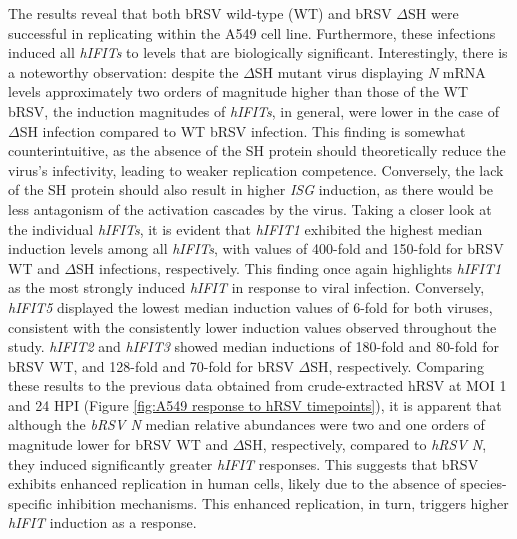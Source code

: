 The results reveal that both bRSV wild-type (WT) and bRSV \(\Delta\)SH were successful in replicating within the A549 cell line. Furthermore, these infections induced all \textit{hIFITs} to levels that are biologically significant. Interestingly, there is a noteworthy observation: despite the \(\Delta\)SH mutant virus displaying \textit{N} mRNA levels approximately two orders of magnitude higher than those of the WT bRSV, the induction magnitudes of \textit{hIFITs}, in general, were lower in the case of \(\Delta\)SH infection compared to WT bRSV infection. This finding is somewhat counterintuitive, as the absence of the SH protein should theoretically reduce the virus's infectivity, leading to weaker replication competence. Conversely, the lack of the SH protein should also result in higher \textit{ISG} induction, as there would be less antagonism of the activation cascades by the virus. Taking a closer look at the individual \textit{hIFITs}, it is evident that \textit{hIFIT1} exhibited the highest median induction levels among all \textit{hIFITs}, with values of 400-fold and 150-fold for bRSV WT and \(\Delta\)SH infections, respectively. This finding once again highlights \textit{hIFIT1} as the most strongly induced \textit{hIFIT} in response to viral infection. Conversely, \textit{hIFIT5} displayed the lowest median induction values of 6-fold for both viruses, consistent with the consistently lower induction values observed throughout the study. \textit{hIFIT2} and \textit{hIFIT3} showed median inductions of 180-fold and 80-fold for bRSV WT, and 128-fold and 70-fold for bRSV \(\Delta\)SH, respectively. Comparing these results to the previous data obtained from crude-extracted hRSV at MOI 1 and 24 HPI (Figure \ref{fig:A549 response to hRSV timepoints}), it is apparent that although the \textit{bRSV N} median relative abundances were two and one orders of magnitude lower for bRSV WT and \(\Delta\)SH, respectively, compared to \textit{hRSV N}, they induced significantly greater \textit{hIFIT} responses. This suggests that bRSV exhibits enhanced replication in human cells, likely due to the absence of species-specific inhibition mechanisms. This enhanced replication, in turn, triggers higher \textit{hIFIT} induction as a response.

